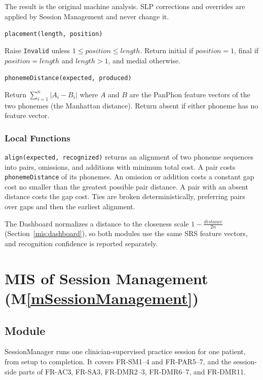 \documentclass[12pt, titlepage]{article}
\newcommand{\mref}[1]{M\ref{#1}}
\begin{document}
\begin{description}
\begin{enumerate}
\end{enumerate}
The result is the original machine analysis. SLP corrections and overrides are
applied by Session Management and never change it.
\item[] \texttt{placement(length, position)}\par
Raise \texttt{Invalid} unless $1 \le position \le length$. Return initial if
$position = 1$, final if $position = length$ and $length > 1$, and medial
otherwise.
\item[] \texttt{phonemeDistance(expected, produced)}\par
Return $\sum_{i=1}^{n}|A_i-B_i|$ where $A$ and $B$ are the PanPhon feature
vectors of the two phonemes (the Manhattan distance). Return absent if either
phoneme has no feature vector.
\end{description}

\subsubsection{Local Functions}
\texttt{align(expected, recognized)} returns an alignment of two phoneme
sequences into pairs, omissions, and additions with minimum total cost. A pair
costs \texttt{phonemeDistance} of its phonemes. An omission or addition costs a
constant gap cost no smaller than the greatest possible pair distance. A pair
with an absent distance costs the gap cost. Ties are broken deterministically,
preferring pairs over gaps and then the earliest alignment.

\noindent The Dashboard normalizes a distance to the closeness scale
$1 - \frac{distance}{2n}$ (Section~\ref{mis:dashboard}), so both modules use
the same SRS feature vectors, and recognition confidence is reported separately.

\clearpage

\section{MIS of Session Management (\mref{mSessionManagement})} \label{mis:session}

\subsection{Module}
SessionManager runs one clinician-supervised practice session for one
patient, from setup to completion. It covers FR-SM1--4 and FR-PAR5--7, and the
session-side parts of FR-AC3, FR-SA3, FR-DMR2--3, FR-DMR6--7, and FR-DMR11.
\end{document}
